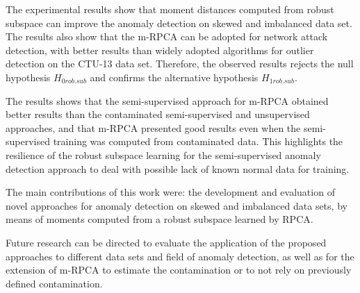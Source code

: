 The experimental results show that moment distances computed from robust subspace can improve the anomaly detection on skewed and imbalanced data set. The results also show that the m-RPCA can be adopted for network attack detection, with better results than widely adopted algorithms for outlier detection on the CTU-13 data set. Therefore, the observed results rejects the null hypothesis  $H_{0rob.sub}$ and confirms the alternative
hypothesis $H_{1rob.sub}$.

The results shows that the semi-supervised approach for m-RPCA obtained better results than the contaminated semi-supervised and unsupervised approaches, and that m-RPCA presented good results even when the semi-supervised training was computed from contaminated data. This highlights the resilience of the robust subspace learning for the semi-supervised anomaly detection approach to deal with possible lack of known normal data for training. 

The main contributions of this work were: the development and evaluation of novel approaches for anomaly detection on skewed and imbalanced data sets, by means of moments computed from a robust subspace learned by RPCA.

Future research can be directed to evaluate the application of the proposed approaches to different data sets and field of anomaly detection, as well as for the extension of m-RPCA to estimate the contamination or to not rely on previously defined contamination.